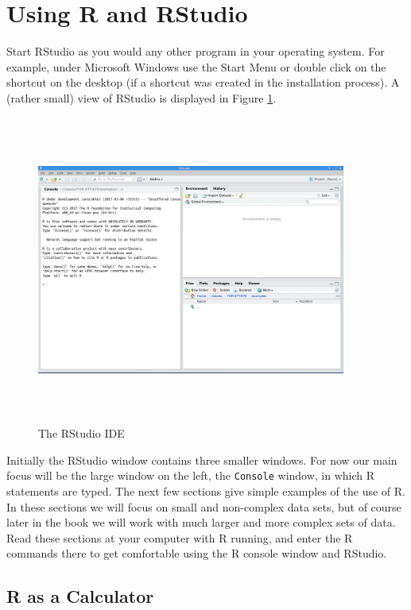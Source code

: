 \documentclass[]{krantz}
\begin{document}
\section{Using R and RStudio}\label{using-r-and-rstudio}

Start RStudio as you would any other program in your operating system.
For example, under Microsoft Windows use the Start Menu or double click
on the shortcut on the desktop (if a shortcut was created in the
installation process). A (rather small) view of RStudio is displayed in
Figure \ref{fig:rstudioPic}.

\begin{figure}
\includegraphics[width=4in,height=4in]{../figures/RStudio} \caption{The RStudio IDE}\label{fig:rstudioPic}
\end{figure}

Initially the RStudio window contains three smaller windows. For now our
main focus will be the large window on the left, the \texttt{Console}
window, in which R statements are typed. The next few sections give
simple examples of the use of R. In these sections we will focus on
small and non-complex data sets, but of course later in the book we will
work with much larger and more complex sets of data. Read these sections
at your computer with R running, and enter the R commands there to get
comfortable using the R console window and RStudio.

\subsection{R as a Calculator}\label{r-as-a-calculator}
\end{document}

